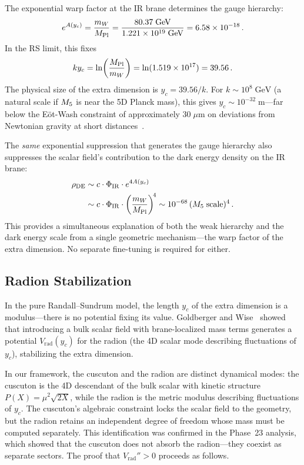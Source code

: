 The exponential warp factor at the IR brane determines the gauge hierarchy:
\begin{equation}
\label{eq:1-hierarchy}
e^{A(y_c)} = \frac{m_W}{M_{\mathrm{Pl}}} = \frac{80.37\;\mathrm{GeV}}{1.221 \times 10^{19}\;\mathrm{GeV}} = 6.58 \times 10^{-18}\,.
\end{equation}
In the RS limit, this fixes
\begin{equation}
\label{eq:1-kyc}
ky_c = \ln\!\left(\frac{M_{\mathrm{Pl}}}{m_W}\right) = \ln(1.519 \times 10^{17}) = 39.56\,.
\end{equation}
The physical size of the extra dimension is $y_c = 39.56/k$. For $k \sim 10^8\;\mathrm{GeV}$ (a natural scale if $M_5$ is near the 5D Planck mass), this gives $y_c \sim 10^{-32}\;\mathrm{m}$---far below the E\"{o}t-Wash constraint of approximately $30\;\mu\mathrm{m}$ on deviations from Newtonian gravity at short distances~\cite{ch1:kapner07}.

The \emph{same} exponential suppression that generates the gauge hierarchy also suppresses the scalar field's contribution to the dark energy density on the IR brane:
\begin{align}
\label{eq:1-rho-de}
\rho_{\mathrm{DE}} &\sim c \cdot \Phi_{\mathrm{IR}} \cdot e^{4A(y_c)} \notag\\
  &\sim c \cdot \Phi_{\mathrm{IR}} \cdot \left(\frac{m_W}{M_{\mathrm{Pl}}}\right)^{\!4}
  \sim 10^{-68}\, (M_5\;\text{scale})^4\,.
\end{align}
This provides a simultaneous explanation of both the weak hierarchy and the dark energy scale from a single geometric mechanism---the warp factor of the extra dimension. No separate fine-tuning is required for either.

\subsection{Radion Stabilization}
\label{sec:1-radion}

In the pure Randall--Sundrum model, the length $y_c$ of the extra dimension is a modulus---there is no potential fixing its value. Goldberger and Wise~\cite{ch1:goldberger99} showed that introducing a bulk scalar field with brane-localized mass terms generates a potential $V_{\mathrm{rad}}(y_c)$ for the radion (the 4D scalar mode describing fluctuations of $y_c$), stabilizing the extra dimension.

In our framework, the cuscuton and the radion are distinct dynamical modes: the cuscuton is the 4D descendant of the bulk scalar with kinetic structure $P(X) = \mu^2\sqrt{2X}$, while the radion is the metric modulus describing fluctuations of $y_c$. The cuscuton's algebraic constraint locks the scalar field to the geometry, but the radion retains an independent degree of freedom whose mass must be computed separately. This identification was confirmed in the Phase~23 analysis, which showed that the cuscuton does not absorb the radion---they coexist as separate sectors. The proof that $V_{\mathrm{rad}}'' > 0$ proceeds as follows.

